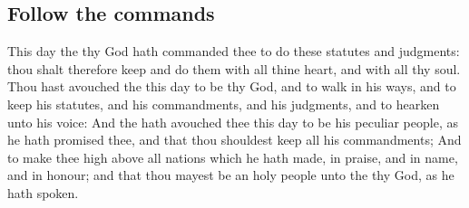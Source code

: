 \begin{biblechapter}
\section*{Follow the \LORDs commands}
\verse This day the \LORD thy God hath commanded thee to do these statutes and judgments: thou shalt therefore keep and do them with all thine heart, and with all thy soul.
\verse Thou hast avouched the \LORD this day to be thy God, and to walk in his ways, and to keep his statutes, and his commandments, and his judgments, and to hearken unto his voice:
\verse And the \LORD hath avouched thee this day to be his peculiar people, as he hath promised thee, and that thou shouldest keep all his commandments;
\verse And to make thee high above all nations which he hath made, in praise, and in name, and in honour; and that thou mayest be an holy people unto the \LORD thy God, as he hath spoken.
\end{biblechapter}

